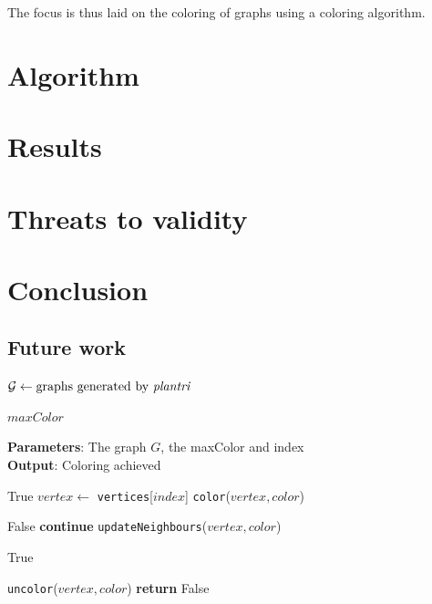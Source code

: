 \documentclass{article}
\begin{document}
The focus is thus laid on the coloring of graphs using a coloring algorithm. 




\section{Algorithm}

\section{Results}

\section{Threats to validity}

\section{Conclusion}

\subsection{Future work}





	\begin{algorithm}[tb!]
		\caption{Kleuren van grafen}
		\begin{algorithmic}[1]
			\STATE $\mathcal{G} \gets \text{graphs generated by \textit{plantri}}$
			
			\RETURN $maxColor$
			\ENDIF
			\ENDFOR
			\ENDFOR
		\end{algorithmic}
	\end{algorithm}
	

	
	\begin{algorithm}[tb]
		\caption{\texttt{colorGraph}}
		\textbf{Parameters}: The graph $G$, the maxColor and index\\
		\textbf{Output}: Coloring achieved
		\begin{algorithmic}[1]
		\RETURN True
		\ENDIF
		\STATE $vertex \gets $ \texttt{vertices}[$index$]
		\STATE \texttt{color}($vertex, color$)
		
		\RETURN False
		\STATE \textbf{continue}
		\ENDIF
		\STATE \texttt{updateNeighbours}($vertex, color$)
		
		\RETURN True
		\ENDIF
		\ENDFOR
		
		\STATE \texttt{uncolor}($vertex, color$)
		\STATE \textbf{return} False
		\end{algorithmic}
	\end{algorithm}
	
\end{document}
